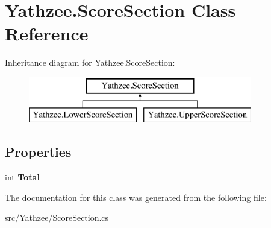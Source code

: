 \hypertarget{class_yathzee_1_1_score_section}{}\section{Yathzee.\+Score\+Section Class Reference}
\label{class_yathzee_1_1_score_section}
Inheritance diagram for Yathzee.\+Score\+Section\+:\begin{figure}[H]
\begin{center}
\leavevmode
\includegraphics[height=2.000000cm]{class_yathzee_1_1_score_section}
\end{center}
\end{figure}
\subsection*{Properties}
\begin{DoxyCompactItemize}
\item 
int {\bfseries Total}\hypertarget{class_yathzee_1_1_score_section_a58581bbdd2cda719e5f1dcd7659c412f}{}\label{class_yathzee_1_1_score_section_a58581bbdd2cda719e5f1dcd7659c412f}

\end{DoxyCompactItemize}


The documentation for this class was generated from the following file\+:\begin{DoxyCompactItemize}
\item 
src/\+Yathzee/Score\+Section.\+cs\end{DoxyCompactItemize}
